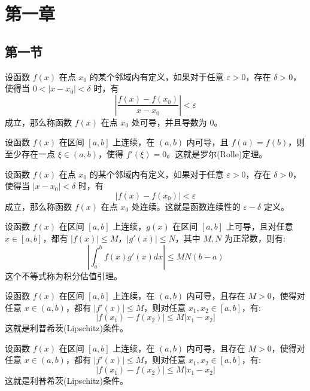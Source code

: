 \section{第一章}
\subsection{第一节}

\begin{thmblock}
	设函数 $f(x)$ 在点 $x_0$ 的某个邻域内有定义，如果对于任意 $\varepsilon > 0$，存在 $\delta > 0$，使得当 $0 < |x - x_0| < \delta$ 时，有
	\[
	\left|\frac{f(x) - f(x_0)}{x - x_0}\right| < \varepsilon
	\]
	成立，那么称函数 $f(x)$ 在点 $x_0$ 处可导，并且导数为 0。
\end{thmblock}

\begin{thmblock}
	设函数 $f(x)$ 在区间 $[a,b]$ 上连续，在 $(a,b)$ 内可导，且 $f(a)=f(b)$，则至少存在一点 $\xi \in (a,b)$，使得 $f'(\xi)=0$。这就是罗尔(Rolle)定理。
\end{thmblock}

\begin{defblock}
设函数 $f(x)$ 在点 $x_0$ 的某个邻域内有定义，如果对于任意 $\varepsilon > 0$，存在 $\delta > 0$，使得当 $|x - x_0| < \delta$ 时，有
\[
|f(x) - f(x_0)| < \varepsilon
\]
成立，那么称函数 $f(x)$ 在点 $x_0$ 处连续。这就是函数连续性的 $\varepsilon-\delta$ 定义。
\end{defblock}

\begin{lemmablock}
	设函数 $f(x)$ 在区间 $[a,b]$ 上连续，$g(x)$ 在区间 $[a,b]$ 上可导，且对任意 $x \in [a,b]$，都有 $|f(x)| \leq M$，$|g'(x)| \leq N$，其中 $M,N$ 为正常数，则有:
	\[
	\left|\int_a^b f(x)g'(x)dx\right| \leq MN(b-a)
	\]
	这个不等式称为积分估值引理。
\end{lemmablock}

\begin{propblock}
	设函数 $f(x)$ 在区间 $[a,b]$ 上连续，在 $(a,b)$ 内可导，且存在 $M>0$，使得对任意 $x \in (a,b)$，都有 $|f'(x)| \leq M$，则对任意 $x_1,x_2 \in [a,b]$，有:
	\[
	|f(x_1) - f(x_2)| \leq M|x_1 - x_2|
	\]
	这就是利普希茨(Lipschitz)条件。
\end{propblock}

\begin{colblock}
	设函数 $f(x)$ 在区间 $[a,b]$ 上连续，在 $(a,b)$ 内可导，且存在 $M>0$，使得对任意 $x \in (a,b)$，都有 $|f'(x)| \leq M$，则对任意 $x_1,x_2 \in [a,b]$，有:
	\[
	|f(x_1) - f(x_2)| \leq M|x_1 - x_2|
	\]
	这就是利普希茨(Lipschitz)条件。
\end{colblock}

